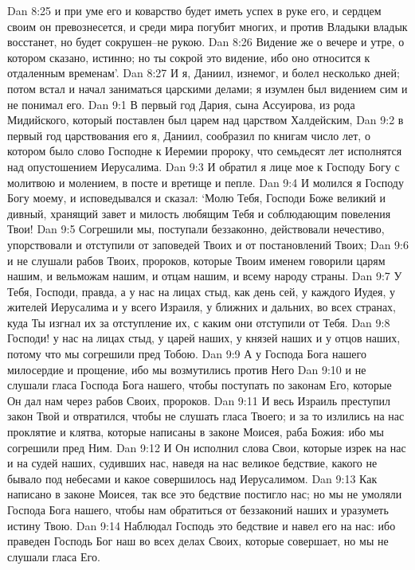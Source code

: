 Dan 8:25  и при уме его и коварство будет иметь успех в руке его, и сердцем своим он превознесется, и среди мира погубит многих, и против Владыки владык восстанет, но будет сокрушен--не рукою.
Dan 8:26  Видение же о вечере и утре, о котором сказано, истинно; но ты сокрой это видение, ибо оно относится к отдаленным временам'.
Dan 8:27  И я, Даниил, изнемог, и болел несколько дней; потом встал и начал заниматься царскими делами; я изумлен был видением сим и не понимал его.
Dan 9:1  В первый год Дария, сына Ассуирова, из рода Мидийского, который поставлен был царем над царством Халдейским,
Dan 9:2  в первый год царствования его я, Даниил, сообразил по книгам число лет, о котором было слово Господне к Иеремии пророку, что семьдесят лет исполнятся над опустошением Иерусалима.
Dan 9:3  И обратил я лице мое к Господу Богу с молитвою и молением, в посте и вретище и пепле.
Dan 9:4  И молился я Господу Богу моему, и исповедывался и сказал: `Молю Тебя, Господи Боже великий и дивный, хранящий завет и милость любящим Тебя и соблюдающим повеления Твои!
Dan 9:5  Согрешили мы, поступали беззаконно, действовали нечестиво, упорствовали и отступили от заповедей Твоих и от постановлений Твоих;
Dan 9:6  и не слушали рабов Твоих, пророков, которые Твоим именем говорили царям нашим, и вельможам нашим, и отцам нашим, и всему народу страны.
Dan 9:7  У Тебя, Господи, правда, а у нас на лицах стыд, как день сей, у каждого Иудея, у жителей Иерусалима и у всего Израиля, у ближних и дальних, во всех странах, куда Ты изгнал их за отступление их, с каким они отступили от Тебя.
Dan 9:8  Господи! у нас на лицах стыд, у царей наших, у князей наших и у отцов наших, потому что мы согрешили пред Тобою.
Dan 9:9  А у Господа Бога нашего милосердие и прощение, ибо мы возмутились против Него
Dan 9:10  и не слушали гласа Господа Бога нашего, чтобы поступать по законам Его, которые Он дал нам через рабов Своих, пророков.
Dan 9:11  И весь Израиль преступил закон Твой и отвратился, чтобы не слушать гласа Твоего; и за то излились на нас проклятие и клятва, которые написаны в законе Моисея, раба Божия: ибо мы согрешили пред Ним.
Dan 9:12  И Он исполнил слова Свои, которые изрек на нас и на судей наших, судивших нас, наведя на нас великое бедствие, какого не бывало под небесами и какое совершилось над Иерусалимом.
Dan 9:13  Как написано в законе Моисея, так все это бедствие постигло нас; но мы не умоляли Господа Бога нашего, чтобы нам обратиться от беззаконий наших и уразуметь истину Твою.
Dan 9:14  Наблюдал Господь это бедствие и навел его на нас: ибо праведен Господь Бог наш во всех делах Своих, которые совершает, но мы не слушали гласа Его.
